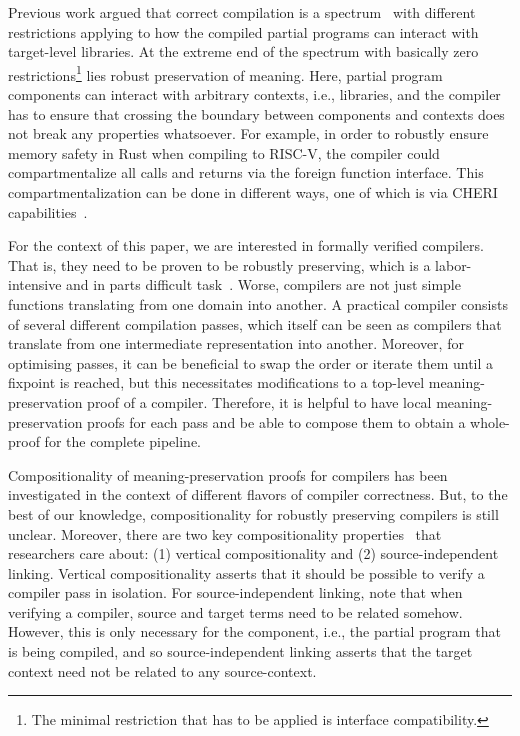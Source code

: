   Previous work argued that correct compilation is a spectrum~\cite{} with different restrictions applying to how the compiled partial programs can interact with target-level libraries.
  At the extreme end of the spectrum with basically zero restrictions\footnote{The minimal restriction that has to be applied is interface compatibility.} lies robust preservation of meaning.
  Here, partial program components can interact with arbitrary contexts, i.e., libraries, and the compiler has to ensure that crossing the boundary between components and contexts does not break any properties whatsoever.
  For example, in order to robustly ensure memory safety in Rust when compiling to RISC-V, the compiler could compartmentalize all calls and returns via the foreign function interface.
  This compartmentalization can be done in different ways, one of which is via CHERI capabilities~\cite{}. 

  For the context of this paper, we are interested in formally verified compilers. 
  That is, they need to be proven to be robustly preserving, which is a labor-intensive and in parts difficult task~\cite{}. 
  Worse, compilers are not just simple functions translating from one domain into another. 
  A practical compiler consists of several different compilation passes, which itself can be seen as compilers that translate from one intermediate representation into another.
  Moreover, for optimising passes, it can be beneficial to swap the order or iterate them until a fixpoint is reached, but this necessitates modifications to a top-level meaning-preservation proof of a compiler.
  Therefore, it is helpful to have local meaning-preservation proofs for each pass and be able to compose them to obtain a whole-proof for the complete pipeline.

  Compositionality of meaning-preservation proofs for compilers has been investigated in the context of different flavors of compiler correctness. 
  But, to the best of our knowledge, compositionality for robustly preserving compilers is still unclear.
  Moreover, there are two key compositionality properties~\cite{} that researchers care about: (1) vertical compositionality and (2) source-independent linking. 
  Vertical compositionality asserts that it should be possible to verify a compiler pass in isolation.
  For source-independent linking, note that when verifying a compiler, source and target terms need to be related somehow.
  However, this is only necessary for the component, i.e., the partial program that is being compiled, and so source-independent linking asserts that the target context need not be related to any source-context.


